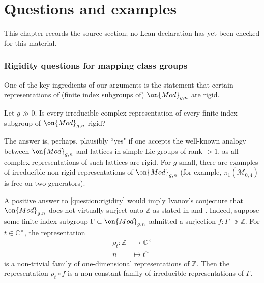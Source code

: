 \chapter{Questions and examples}
\label{canonical-representations-surface-groups-chapter-10}

\begin{remark}
\label{canonical-representations-surface-groups-chapter-10-source}
This chapter records the source section; no Lean declaration has yet been checked for this material.
\notready
\end{remark}

\label{section:questions}
\subsection{Rigidity questions for mapping class groups}
One of the key ingredients of our arguments is the statement that certain representations of (finite index subgroups of) $\on{Mod}_{g,n}$ are rigid.
\begin{question}
\notready\label{question:rigidity}
Let $g\gg 0$. Is every irreducible complex representation of every finite index subgroup of $\on{Mod}_{g,n}$ rigid?
\end{question}
The answer is, perhaps, plausibly ``yes" if one accepts the well-known analogy
between $\on{Mod}_{g,n}$ and lattices in simple Lie groups of rank $>1$, as
all complex representations of such lattices are rigid.
For $g$ small, there
are examples of irreducible non-rigid representations of $\on{Mod}_{g,n}$ (for
example, $\pi_1(\mathscr{M}_{0,4})$ is free on two generators).

\begin{remark}
\notready
	\label{remark:}
	A positive answer to \autoref{question:rigidity} would imply Ivanov's
conjecture that $\on{Mod}_{g,n}$ does not virtually surject onto $\mathbb{Z}$
as stated in \cite[\S 7]{Ivanov:problems} and \cite[Problem
2.11.A]{Kirby:problems}. Indeed, suppose some finite index subgroup
$\Gamma\subset \on{Mod}_{g,n}$ admitted a surjection $f: \Gamma
\twoheadrightarrow\mathbb{Z}$. For $t\in \mathbb{C}^\times$, the representation
\begin{align*}
\rho_t: \mathbb{Z} &\to \mathbb{C}^\times \\
n & \mapsto t^n
\end{align*}
is a non-trivial
family of one-dimensional representations of $\mathbb{Z}$. Then the
representation $\rho_t\circ f$ is a non-constant family of irreducible
representations of $\Gamma$.
\end{remark}

